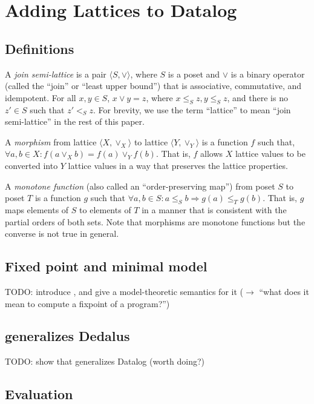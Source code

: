 \section{Adding Lattices to Datalog}
\label{sec:foundation}

\subsection{Definitions}

A \emph{join semi-lattice} is a pair $\langle S, \lor \rangle$, where $S$ is a
poset and $\lor$ is a binary operator (called the ``join'' or ``least upper
bound'') that is associative, commutative, and idempotent. For all $x, y \in S$,
$x \lor y = z$, where $x \leq_S z, y \leq_S z$, and there is no $z' \in S$ such
that $z' <_S z$. For brevity, we use the term ``lattice'' to mean ``join
semi-lattice'' in the rest of this paper.

A \emph{morphism} from lattice $\langle X, \lor_X\rangle$ to lattice $\langle Y,
\lor_Y\rangle$ is a function $f$ such that, $\forall a,b \in X: f(a \lor_X b) =
f(a) \lor_Y f(b)$. That is, $f$ allows $X$ lattice values to be converted into
$Y$ lattice values in a way that preserves the lattice properties.

A \emph{monotone function} (also called an ``order-preserving map'') from poset
$S$ to poset $T$ is a function $g$ such that $\forall a,b \in S: a \leq_S b
\Rightarrow g(a) \leq_T g(b)$. That is, $g$ maps elements of $S$ to elements of
$T$ in a manner that is consistent with the partial orders of both sets. Note
that morphisms are monotone functions but the converse is not true in general.

\subsection{Fixed point and minimal model}

TODO: introduce \baselang, and give a model-theoretic semantics for it ($\to$
``what does it mean to compute a fixpoint of a \baselang program?'')

\subsection{\baselang generalizes Dedalus}

TODO: show that \baselang generalizes Datalog (worth doing?)

\subsection{Evaluation}

